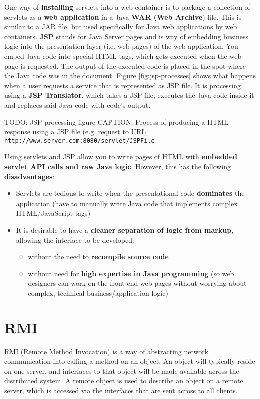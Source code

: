 \documentclass{article}
\begin{document}
One way of \textbf{installing} servlets into a web container is to package a collection of servlets as a \textbf{web application} in a Java \textbf{WAR (Web Archive}) file. This is similar to a JAR file, but used specifically for Java web applications by web containers.
\textbf{JSP} stands for Java Server pages and is way of embedding business logic into the presentation layer (i.e. web pages) of the web application. You embed Java code into special HTML tags, which gets executed when the web page is requested. The output of the executed code is placed in the spot where the Java code was in the document. Figure \ref{fig:jsp-processes} shows what happens when a user requests a service that is represented as JSP file. It is processing using a \textbf{JSP Translator}, which takes a JSP file, executes the Java code inside it and replaces said Java code with code's output.

TODO: JSP processing figure
CAPTION: Process of producing a HTML response using a JSP file (e.g. request to URL \texttt{http://www.server.com:8080/servlet/JSPFile}

Using servlets and JSP allow you to write pages of HTML with \textbf{embedded servlet API calls and raw Java logic}. However, this has the following \textbf{disadvantages}:
\begin{itemize}
	\item Servlets are tedious to write when the presentational code \textbf{dominates} the application (have to manually write Java code that implements complex HTML/JavaScript tags)
	\item It is desirable to have a \textbf{cleaner separation of logic from markup}, allowing the interface to be developed:
	\begin{itemize}
		\item without the need to \textbf{recompile source code}
		\item without need for \textbf{high expertise in Java programming} (so web designers can work on the front-end web pages without worrying about complex, technical business/application logic)
	\end{itemize}
\end{itemize}

\section{RMI}

RMI (Remote Method Invocation) is a way of abstracting network communication into calling a method on an object. An object will typically reside on one server, and interfaces to that object will be made available across the distributed system. A remote object is used to describe an object on a remote server, which is accessed via the interfaces that are sent across to all clients. 
\end{document}
